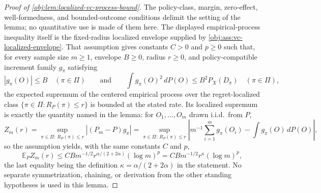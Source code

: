 \begin{proof}[Proof of \cref{obj:lem:localized-vc-process-bound}]
The policy-class, margin, zero-effect, well-formedness, and bounded-outcome conditions delimit the setting of the lemma; no quantitative use is made of them here.  The displayed empirical-process inequality itself is the fixed-radius localized envelope supplied by \cref{obj:ass:vc-localized-envelope}.  That assumption gives constants \(C>0\) and \(p\ge0\) such that, for every sample size \(m\ge1\), envelope \(B\ge0\), radius \(r\ge0\), and policy-compatible increment family \(g_\pi\) satisfying
\[
 |g_\pi(O)|\le B\quad(\pi\in\Pi)
 \qquad\text{and}\qquad
 \int g_\pi(O)^2\,dP(O)\le B^2P_X(D_\pi)\quad(\pi\in\Pi),
\]
the expected supremum of the centered empirical process over the regret-localized class \(\{\pi\in\Pi:R_P(\pi)\le r\}\) is bounded at the stated rate.  Its localized supremum is exactly the quantity named in the lemma: for \(O_1,\ldots,O_m\) drawn i.i.d.\ from \(P\),
\[
Z_m(r)
=
\sup_{\pi\in\Pi:\,R_P(\pi)\le r}\left|(P_m-P)g_\pi\right|
=
\sup_{\pi\in\Pi:\,R_P(\pi)\le r}
\left|m^{-1}\sum_{i=1}^m g_\pi(O_i)-\int g_\pi(O)\,dP(O)\right| ,
\]
so the assumption yields, with the same constants \(C\) and \(p\),
\[
\mathbb E_P Z_m(r)
\le
C B m^{-1/2}r^{\alpha/(2+2\alpha)}(\log m)^p
=
C B m^{-1/2}r^{\kappa}(\log m)^p ,
\]
the last equality being the definition \(\kappa=\alpha/(2+2\alpha)\) in the statement.  No separate symmetrization, chaining, or derivation from the other standing hypotheses is used in this lemma.
\end{proof}

